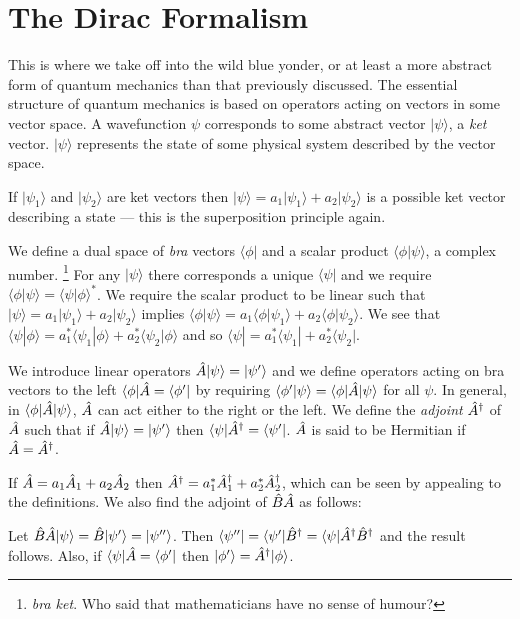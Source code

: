 \documentclass{notes}
\newcommand{\bra}[1]{\langle#1|}
\newcommand{\ket}[1]{|#1\rangle}
\newcommand{\scp}[2]{\langle#1|#2\rangle}
\begin{document}
\section{The Dirac Formalism}

This is where we take off into the wild blue yonder, or at least a more
abstract form of quantum mechanics than that previously discussed. The
essential structure of quantum mechanics is based on operators acting
on vectors in some vector space.  A wavefunction $\psi$ corresponds to
some abstract vector $\ket{\psi}$, a \emph{ket} vector.  $\ket{\psi}$
represents the state of some physical system described by the vector space.

If $\ket{\psi_1}$ and $\ket{\psi_2}$ are
ket vectors then $\ket{\psi} = a_1 \ket{\psi_1}
+ a_2 \ket{\psi_2}$ is a possible ket vector describing a state --- this
is the superposition principle again.

We define a dual space of \emph{bra} vectors $\bra{\phi}$ and a scalar
product $\scp{\phi}{\psi}$, a complex number.%
\footnote{\emph{bra ket}.  Who said that mathematicians have no sense of
  humour?}  For any $\ket{\psi}$ there corresponds a unique
$\bra{\psi}$ and we require $\scp{\phi}{\psi} =
\scp{\psi}{\phi}^\ast$.  We require the scalar product to be linear
such that $\ket{\psi} = a_1 \ket{\psi_1} + a_2 \ket{\psi_2}$ implies
$\scp{\phi}{\psi} = a_1 \scp{\phi}{\psi_1} + a_2 \scp{\phi}{\psi_2}$.
We see that $\scp{\psi}{\phi} = a_1^\ast \scp{\psi_1}{\phi} + a_2^\ast
\scp{\psi_2}{\phi}$ and so $\bra{\psi} = a_1^\ast \bra{\psi_1} +
a_2^\ast \bra{\psi_2}$.

We introduce linear operators $\Hat{A} \ket{\psi} = \ket{\psi'}$ and
we define operators acting on bra vectors to the left
$\bra{\phi}\Hat{A} = \bra{\phi'}$ by requiring $\scp{\phi'}{\psi}
= \bra{\phi}\Hat{A}\ket{\psi}$ for all $\psi$.  In general, in
$\bra{\phi}\Hat{A}\ket{\psi}$, $\Hat{A}$ can act either to the right or
the left.  We define the \emph{adjoint} $\Hat{A}^\dag$ of $\Hat{A}$
such that if $\Hat{A} \ket{\psi} = \ket{\psi'}$ then $\bra{\psi} \Hat{A}^\dag
= \bra{\psi'}$.  $\Hat{A}$ is said to be Hermitian if $\Hat{A}
= \Hat{A}^\dag$.

If $\Hat{A} = a_1 \Hat{A}_1 + a_2 \Hat{A}_2$ then
$\Hat{A}^\dag = a_1^\ast \Hat{A}_1^\dag + a_2^\ast \Hat{A}_2^\dag$, which
can be seen by appealing to the definitions.  We also find the
adjoint of $\Hat{B}\Hat{A}$ as follows:

Let $\Hat{B}\Hat{A} \ket{\psi} = \Hat{B} \ket{\psi'} = \ket{\psi''}$.  Then
$\bra{\psi''} = \bra{\psi'} \Hat{B}^\dag = \bra{\psi} \Hat{A}^\dag
\Hat{B}^\dag$ and the result follows.  Also, if
$\bra{\psi} \Hat{A} = \bra{\phi'}$ then $\ket{\phi'}
= \Hat{A}^\dag \ket{\phi}$.
\end{document}
